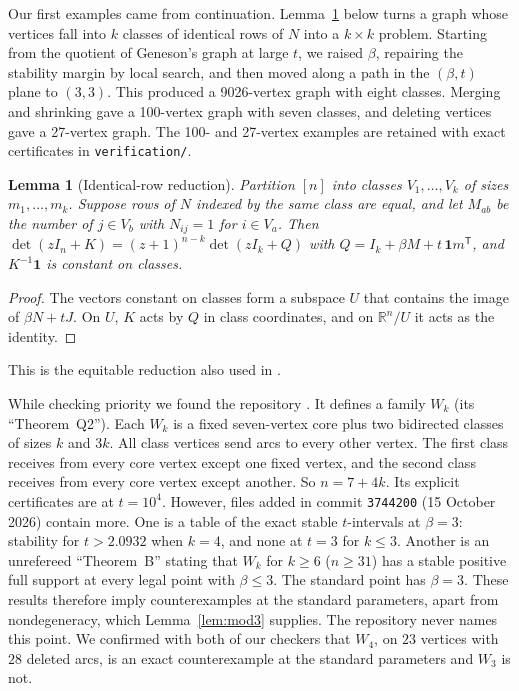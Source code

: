 \documentclass[11pt]{amsart}
\newtheorem{lemma}[theorem]{Lemma}
\theoremstyle{remark}
\newcommand{\one}{\mathbf 1}
\begin{document}
Our first examples came from continuation. Lemma~\ref{lem:quotient} below turns a graph whose vertices fall into $k$ classes of identical rows of $N$ into a $k\times k$ problem. Starting from the quotient of Geneson's graph at large $t$, we raised $\beta$, repairing the stability margin by local search, and then moved along a path in the $(\beta,t)$ plane to $(3,3)$. This produced a 9026-vertex graph with eight classes. Merging and shrinking gave a 100-vertex graph with seven classes, and deleting vertices gave a 27-vertex graph. The 100- and 27-vertex examples are retained with exact certificates in \texttt{verification/}.

\begin{lemma}[Identical-row reduction]\label{lem:quotient}
Partition $[n]$ into classes $V_1,\dots,V_k$ of sizes $m_1,\dots,m_k$. Suppose rows of $N$ indexed by the same class are equal, and let $M_{ab}$ be the number of $j\in V_b$ with $N_{ij}=1$ for $i\in V_a$. Then $\det(zI_n+K)=(z+1)^{n-k}\det(zI_k+Q)$ with $Q=I_k+\beta M+t\,\one m^{\mathsf T}$, and $K^{-1}\one$ is constant on classes.
\end{lemma}

\begin{proof}
The vectors constant on classes form a subspace $U$ that contains the image of $\beta N+tJ$. On $U$, $K$ acts by $Q$ in class coordinates, and on $\mathbb R^n/U$ it acts as the identity.
\end{proof}

This is the equitable reduction also used in \cite[Lemma~4.1]{SixIsMinimal2026}.

While checking priority we found the repository \cite{CLTNrepo}. It defines a family $W_k$ (its ``Theorem~Q2''). Each $W_k$ is a fixed seven-vertex core plus two bidirected classes of sizes $k$ and $3k$. All class vertices send arcs to every other vertex. The first class receives from every core vertex except one fixed vertex, and the second class receives from every core vertex except another. So $n=7+4k$. Its explicit certificates are at $t=10^4$. However, files added in commit \texttt{3744200} (15 October 2026) contain more. One is a table of the exact stable $t$-intervals at $\beta=3$: stability for $t>2.0932$ when $k=4$, and none at $t=3$ for $k\le3$. Another is an unrefereed ``Theorem~B'' stating that $W_k$ for $k\ge6$ ($n\ge31$) has a stable positive full support at every legal point with $\beta\le3$. The standard point has $\beta=3$. These results therefore imply counterexamples at the standard parameters, apart from nondegeneracy, which Lemma~\ref{lem:mod3} supplies. The repository never names this point. We confirmed with both of our checkers that $W_4$, on $23$ vertices with $28$ deleted arcs, is an exact counterexample at the standard parameters and $W_3$ is not.
\end{document}
